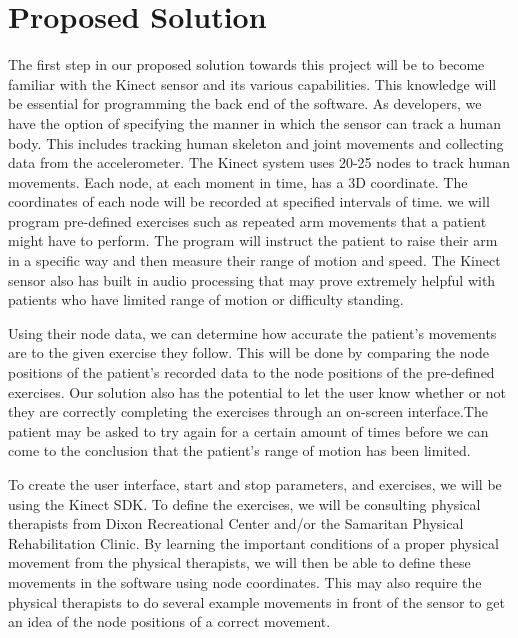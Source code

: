 \documentclass[onecolumn, draftclsnofoot,10pt, compsoc]{IEEEtran}
\begin{document}
\section{Proposed Solution}
The first step in our proposed solution towards this project will be to become familiar with the Kinect sensor and its various capabilities. This knowledge will be essential for programming the back end of the software. As developers, we have the option of specifying the manner in which the sensor can track a human body. This includes tracking human skeleton and joint movements and collecting data from the accelerometer. The Kinect system uses 20-25 nodes to track human movements. Each node, at each moment in time, has a 3D coordinate. The coordinates of each node will be recorded at specified intervals of time. we will program pre-defined exercises such as repeated arm movements that a patient might have to perform. The program will instruct the patient to raise their arm in a specific way and then measure their range of motion and speed. The Kinect sensor also has built in audio processing that may prove extremely helpful with patients who have limited range of motion or difficulty standing. \par

Using their node data, we can determine how accurate the patient's movements are to the given exercise they follow. This will be done by comparing the node positions of the patient's recorded data to the node positions of the pre-defined exercises. Our solution also has the potential to let the user know whether or not they are correctly completing the exercises through an on-screen interface.The patient may be asked to try again for a certain amount of times before we can come to the conclusion that the patient's range of motion has been limited. \par

To create the user interface, start and stop parameters, and exercises, we will be using the Kinect SDK. To define the exercises, we will be consulting physical therapists from Dixon Recreational Center and/or the Samaritan Physical Rehabilitation Clinic. By learning the important conditions of a proper physical movement from the physical therapists, we will then be able to define these movements in the software using node coordinates. This may also require the physical therapists to do several example movements in front of the sensor to get an idea of the node positions of a correct movement. \par
\end{document}
